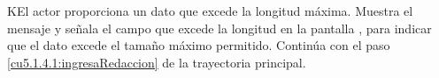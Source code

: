  \begin{UCtrayectoriaA}{K}{El actor proporciona un dato que excede la longitud máxima.}
    \UCpaso[\UCsist] Muestra el mensaje  y señala el campo que excede la 
    longitud en la pantalla , para indicar que el dato excede el tamaño máximo permitido.
    \UCpaso[] Continúa con el paso \ref{cu5.1.4.1:ingresaRedaccion} de la trayectoria principal.
 \end{UCtrayectoriaA}

  